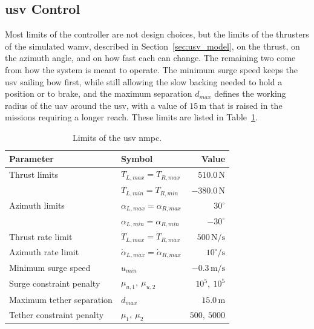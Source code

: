 \subsection{\texorpdfstring{\gls{usv} Control}{USV Control}}
\label{subsec:usv_controller_implementation}

Most limits of the controller are not design choices, but the limits of the thrusters of the simulated \gls{wamv}, described in Section~\ref{sec:usv_model}, on the thrust, on the azimuth angle, and on how fast each can change. The remaining two come from how the system is meant to operate. The minimum surge speed keeps the \gls{usv} sailing bow first, while still allowing the slow backing needed to hold a position or to brake, and the maximum separation $d_{max}$ defines the working radius of the \gls{uav} around the \gls{usv}, with a value of $15\,\text{m}$ that is raised in the missions requiring a longer reach. These limits are listed in Table~\ref{tab:usv_ctrl_limits}.

\begin{table}[!b]
    \centering
    \caption{Limits of the \gls{usv} \gls{nmpc}.}
    \label{tab:usv_ctrl_limits}
    \begin{tabular*}{0.75\linewidth}{@{\extracolsep{\fill}}llr}
        \toprule
        \textbf{Parameter} & \textbf{Symbol} & \textbf{Value} \\
        \midrule
        Thrust limits & $T_{L,max}=T_{R,max}$ & $510.0\,\text{N}$ \\
         & $T_{L,min}=T_{R,min}$ & $-380.0\,\text{N}$ \\
        Azimuth limits & $\alpha_{L,max}=\alpha_{R,max}$ & $30^\circ$ \\
         & $\alpha_{L,min}=\alpha_{R,min}$ & $-30^\circ$ \\
        Thrust rate limit & $\dot T_{L,max}=\dot T_{R,max}$ & $500\,\text{N/s}$ \\
        Azimuth rate limit & $\dot\alpha_{L,max}=\dot\alpha_{R,max}$ & $10^\circ/\text{s}$ \\
        Minimum surge speed & $u_{min}$ & $-0.3\,\text{m/s}$ \\
        Surge constraint penalty & $\mu_{u,1},\ \mu_{u,2}$ & $10^5,\ 10^5$ \\
        Maximum tether separation & $d_{max}$ & $15.0\,\text{m}$ \\
        Tether constraint penalty & $\mu_1,\ \mu_2$ & $500,\ 5000$ \\
        \bottomrule
    \end{tabular*}
\end{table}

